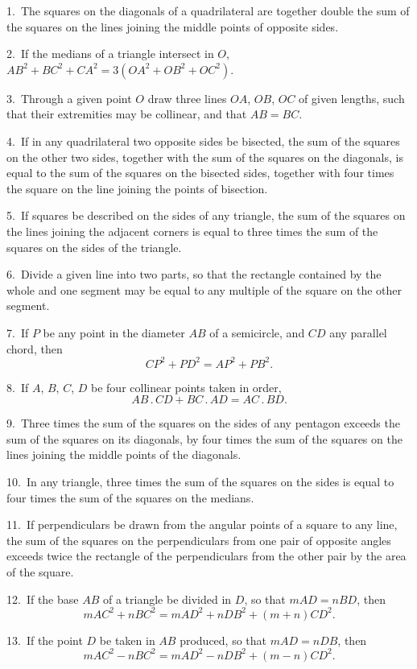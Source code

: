 \documentclass[oneside]{book}
\begin{document}
\begin{footnotesize}
1.~The squares on the diagonals of a quadrilateral are together
double the sum of the squares on the lines joining the middle
points of opposite sides.

2.~If the medians of a triangle intersect in $O$, $AB^{2} + BC^{2} + CA^{2}
=3(OA^{2} + OB^{2} + OC^{2})$.

3.~Through a given point $O$ draw three lines $OA$, $OB$, $OC$ of
given lengths, such that their extremities may be collinear, and
that $AB = BC$.

4.~If in any quadrilateral two opposite sides be bisected, the
sum of the squares on the other two sides, together with the sum
of the squares on the diagonals, is equal to the sum of the squares
on the bisected sides, together with four times the square on the
line joining the points of bisection.

5.~If squares be described on the sides of any triangle, the
sum of the squares on the lines joining the adjacent corners is
equal to three times the sum of the squares on the sides of the
triangle.


6.~Divide a given line into two parts, so that the rectangle
contained by the whole and one segment may be equal to any
multiple of the square on the other segment.

7.~If $P$ be any point in the diameter $AB$ of a semicircle, and
$CD$ any parallel chord, then
\[
CP^2 + PD^2 = AP^2 + PB^2.
\]

8.~If $A$, $B$, $C$, $D$ be four collinear points taken in order,
\[
AB\,.\,CD + BC\,.\,AD = AC\,.\,BD.
\]

9.~Three times the sum of the squares on the sides of any
pentagon exceeds the sum of the squares on its diagonals, by four
times the sum of the squares on the lines joining the middle
points of the diagonals.

10.~In any triangle, three times the sum of the squares on the
sides is equal to four times the sum of the squares on the medians.

11.~If perpendiculars be drawn from the angular points of a
square to any line, the sum of the squares on the perpendiculars
from one pair of opposite angles exceeds twice the rectangle
of the perpendiculars from the other pair by the area of the
square.

12.~If the base $AB$ of a triangle be divided in $D$, so that $mAD
= nBD$, then
\[
mAC^2 + nBC^2 = mAD^2 + nDB^2 + (m + n) CD^2.
\]

13.~If the point $D$ be taken in $AB$ produced, so that $mAD
= nDB$, then
\[
mAC^2 - nBC^2 = mAD^2 - nDB^2 + (m - n) CD^2.
\]


\end{footnotesize}
\end{document}
